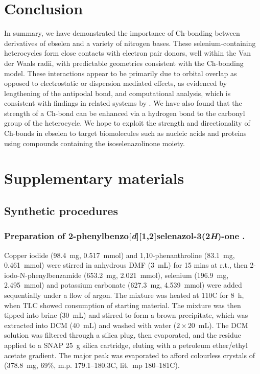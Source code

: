 \begin{refsection}
    \section{Conclusion}
    In summary, we have demonstrated the importance of Ch-bonding between derivatives of ebselen  and a variety of nitrogen bases.
    These selenium-containing heterocycles form close contacts with electron pair donors, well within the Van der Waals radii, with predictable geometries consistent with the Ch-bonding model.
    These interactions appear to be primarily due to orbital overlap as opposed to electrostatic or dispersion mediated effects, as evidenced by lengthening of the antipodal  bond, and computational analysis, which is consistent with findings in related systems by \citeauthor{Pascoe2017}.\autocite{Pascoe2017}
    We have also found that the strength of a Ch-bond can be enhanced via a hydrogen bond to the carbonyl group of the heterocycle.
    We hope to exploit the strength and directionality of Ch-bonds in ebselen to target biomolecules such as nucleic acids and proteins using compounds containing the isoselenazolinone moiety.
    
    \section{Supplementary materials}
    
    \subsection{Synthetic procedures}
    
    \subsubsection[Preparation of \refcmpd{ebs}.]{Preparation of 2-phenylbenzo[\textit{d}][1,2]selenazol-3(2\textit{H})-one .}
    
    Copper iodide (98.4~mg, 0.517~mmol) and 1,10-phenanthroline (83.1~mg, 0.461~mmol) were stirred in anhydrous DMF (3~mL) for 15 mins at r.t., then 2-iodo-N-phenylbenz\-amide (653.2~mg, 2.021~mmol), selenium (196.9~mg, 2.495~mmol) and potassium carbonate (627.3~mg, 4.539~mmol) were added sequentially under a flow of argon.
    The mixture was heated at 110\degree{}C for 8~h, when TLC showed consumption of starting material.
    The mixture was then tipped into brine (30~mL) and stirred to form a brown precipitate, which was extracted into DCM (40~mL) and washed with water ($ 2 \times 20 $~mL).
    The DCM solution was filtered through a silica plug, then evaporated, and the residue applied to a SNAP 25~g silica cartridge, eluting with a petroleum ether/ethyl acetate gradient.
    The major peak was evaporated to afford colourless crystals of  (378.8~mg, 69\%, m.p. 179.1--180.3\degree{}C, lit.\ mp 180--181\degree{}C). 
    

\end{refsection}
